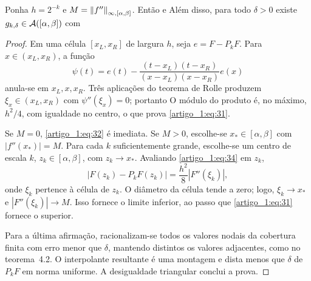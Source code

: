 \begin{teorema}\label{map:artigo_1:5.1}
Ponha $h=2^{-k}$ e $M=\left\|f''\right\|_{\infty,[\alpha,\beta]}$. Então
e
Além disso, para todo $\delta>0$ existe $g_{k,\delta}\in\mathcal A([\alpha,\beta])$ com
\end{teorema}
\begin{proof}
Em uma célula $[x_L,x_R]$ de largura $h$, seja $e=F-P_kF$. Para $x\in(x_L,x_R)$, a função
\[
\psi(t)=e(t)-\frac{(t-x_L)(t-x_R)}{(x-x_L)(x-x_R)}e(x)
\]
anula-se em $x_L,x,x_R$. Três aplicações do teorema de Rolle produzem $\xi_x\in(x_L,x_R)$ com $\psi''(\xi_x)=0$; portanto
O módulo do produto é, no máximo, $h^2/4$, com igualdade no centro, o que prova \eqref{artigo_1:eq:31}.

Se $M=0$, \eqref{artigo_1:eq:32} é imediata. Se $M>0$, escolhe-se $x_*\in[\alpha,\beta]$ com $|f''(x_*)|=M$. Para cada $k$ suficientemente grande, escolhe-se um centro de escala $k$, $z_k\in[\alpha,\beta]$, com $z_k\to x_*$. Avaliando \eqref{artigo_1:eq:34} em $z_k$,
\[
|F(z_k)-P_kF(z_k)|=\frac{h^2}8|F''(\xi_k)|,
\]
onde $\xi_k$ pertence à célula de $z_k$. O diâmetro da célula tende a zero; logo, $\xi_k\to x_*$ e $|F''(\xi_k)|\to M$. Isso fornece o limite inferior, ao passo que \eqref{artigo_1:eq:31} fornece o superior.

Para a última afirmação, racionalizam-se todos os valores nodais da cobertura finita com erro menor que $\delta$, mantendo distintos os valores adjacentes, como no teorema~4.2. O interpolante resultante é uma montagem e dista menos que $\delta$ de $P_kF$ em norma uniforme. A desigualdade triangular conclui a prova.
\end{proof}

